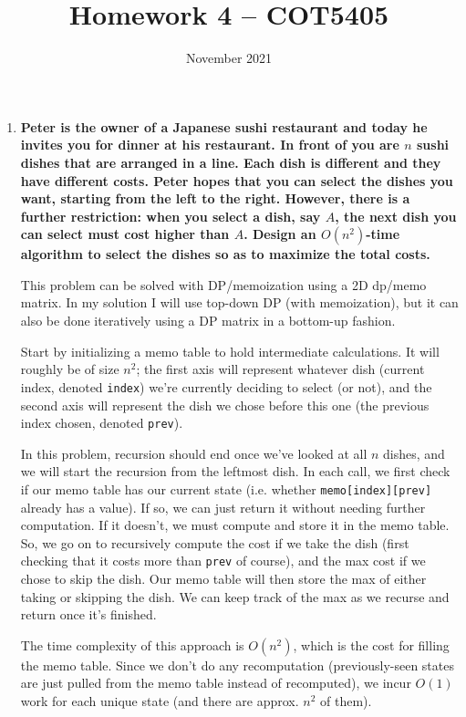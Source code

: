 \documentclass[12pt]{article}
\title{Homework 4 -- COT5405
}
\date{November 2021}
\begin{document}
\maketitle

\begin{enumerate}
    \item \textbf{Peter is the owner of a Japanese sushi restaurant and today he invites you for dinner 
    at his restaurant. In front of you are $n$ sushi dishes that are arranged in a line. Each dish is 
    different and they have different costs. Peter hopes that you can select the dishes you want, starting 
    from the left to the right. However, there is a further restriction: when you select a dish, say $A$, the 
    next dish you can select must cost higher than $A$.  Design an $O(n^2)$-time algorithm to select the dishes 
    so as to maximize the total costs.}
    
    This problem can be solved with DP/memoization using a 2D dp/memo matrix. In my solution I will use top-down DP (with memoization), but it can also be done iteratively using a DP matrix in a bottom-up fashion.
    
    Start by initializing a memo table to hold intermediate calculations. It will roughly be of size $n^2$; the first axis will represent whatever dish (current index, denoted \texttt{index}) we're currently deciding to select (or not), and the second axis will represent the dish we chose before this one (the previous index chosen, denoted \texttt{prev}).
    
    In this problem, recursion should end once we've looked at all $n$ dishes, and we will start the recursion from the leftmost dish. In each call, we first check if our memo table has our current state (i.e. whether \texttt{memo[index][prev]} already has a value). If so, we can just return it without needing further computation. If it doesn't, we must compute and store it in the memo table. So, we go on to recursively compute the cost if we take the dish (first checking that it costs more than \texttt{prev} of course), and the max cost if we chose to skip the dish. Our memo table will then store the max of either taking or skipping the dish. We can keep track of the max as we recurse and return once it's finished.
    
    The time complexity of this approach is $O(n^2)$, which is the cost for filling the memo table. Since we don't do any recomputation (previously-seen states are just pulled from the memo table instead of recomputed), we incur $O(1)$ work for each unique state (and there are approx. $n^2$ of them).
    

\end{enumerate}
\end{document}
